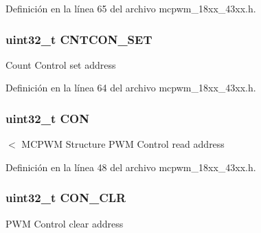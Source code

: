 Definición en la línea 65 del archivo mcpwm\+\_\+18xx\+\_\+43xx.\+h.

\subsubsection[{\texorpdfstring{C\+N\+T\+C\+O\+N\+\_\+\+S\+ET}{CNTCON_SET}}]{ uint32\+\_\+t C\+N\+T\+C\+O\+N\+\_\+\+S\+ET}\hypertarget{struct_l_p_c___m_c_p_w_m___t_a2ae78a6251b05aac82a50e2ab397779b}{}\label{struct_l_p_c___m_c_p_w_m___t_a2ae78a6251b05aac82a50e2ab397779b}
Count Control set address 

Definición en la línea 64 del archivo mcpwm\+\_\+18xx\+\_\+43xx.\+h.

\subsubsection[{\texorpdfstring{C\+ON}{CON}}]{ uint32\+\_\+t C\+ON}\hypertarget{struct_l_p_c___m_c_p_w_m___t_a2a40f71c79507ea86bc99aaf2e876d4b}{}\label{struct_l_p_c___m_c_p_w_m___t_a2a40f71c79507ea86bc99aaf2e876d4b}
$<$ M\+C\+P\+WM Structure P\+WM Control read address 

Definición en la línea 48 del archivo mcpwm\+\_\+18xx\+\_\+43xx.\+h.

\subsubsection[{\texorpdfstring{C\+O\+N\+\_\+\+C\+LR}{CON_CLR}}]{ uint32\+\_\+t C\+O\+N\+\_\+\+C\+LR}\hypertarget{struct_l_p_c___m_c_p_w_m___t_af2eb3afd682d54a15636b6749c65cb57}{}\label{struct_l_p_c___m_c_p_w_m___t_af2eb3afd682d54a15636b6749c65cb57}
P\+WM Control clear address 

